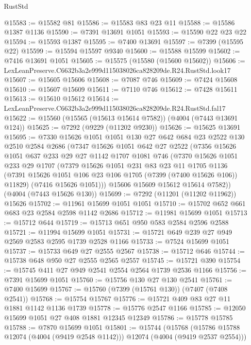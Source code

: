 \begin{lexlean}{RustStd}
\begin{coremodule}
@15583 := @15582 @81
@15586 := @15583 @83 @23 @11
@15588 := @15586 @1387 @1136
@15590 := @7391 @13691 @1051
@15593 := @15590 @22 @23 @22
@15594 := @15593 @1387
@15595 := @7400 @13691
@15597 := @7399 (@15595 @22)
@15599 := @15594 @15597 @9340
@15600 := @15588 @15599
@15602 := @7416 @13691 @1051
@15605 := @15575 (@15580 (@15600 @15602))
@15606 := LexLeanPreserve.C6632b3a2e999d115038026ca828209de.R24.RustStd.look17
@15607 := @15605 @15606
@15608 := @7087 @746
@15609 := @7424 @15608
@15610 := @15607 @15609
@15611 := @7110 @746
@15612 := @7428 @15611
@15613 := @15610 @15612
@15614 := LexLeanPreserve.C6632b3a2e999d115038026ca828209de.R24.RustStd.fal17
@15622 := @15560 (@15565 (@15613 @15614 @7582)) (@4004 (@7443 @13691 @124))
@15625 := @7292 (@9229 (@11202 @9230))
@15626 := @15625 @13691
@15695 := @7330
    @15626
    @1051
    @1051
    @130
    @27
    @642
    @684
    @23
    @2522
    @130
    @2510
    @2584
    @2686
    (@7347
      @15626
      @1051
      @642
      @27
      @2522
      (@7356
        @15626
        @1051
        @637
        @233
        @29
        @27
        @1142
        @1707
        @1081
        @746
        (@7370
          @15626
          @1051
          @233
          @29
          @1707
          (@7379
            @15626
            @1051
            @231
            @83
            @23
            @11
            @1705
            @1136
            (@7391 @15626 @1051 @106 @23 @106 @1705 (@7399 (@7400 @15626 @106)) @11829)
            (@7416 @15626 @1051)))
        @15606
        @15609
        @15612
        @15614
        @7582))
    (@4004 (@7443 @15626 @130))
@15699 := @7292 (@11201 (@11202 @11962)) @15626
@15702 := @11961 @15699 @1051 @1051
@15710 := @15702 @652 @661 @683 @23 @2584 @2598 @1142 @2686
@15712 := @11981 @15699 @1051
@15713 := @15712 @644
@15719 := @15713 @651 @950 @583 @2584 @2596 @2588
@15721 := @11994 @15699 @1051
@15731 := @15721 @649 @239 @27 @949 @2569 @2583 @2595 @1739 @2528 @1166
@15733 := @7524 @15699 @1051
@15737 := @15733 @649 @27 @2555 @2567
@15738 := @15712 @646
@15744 := @15738 @648 @950 @27 @2555 @2565 @2557
@15745 := @15721 @390
@15754 := @15745 @411 @27 @949 @2541 @2554 @2564 @1739 @2536 @1166
@15756 := @7391 @15699 @1051
@15760 := @15756 @130 @27 @130 @2541
@15761 := @7400 @15699
@15767 := @15760 (@7399 (@15761 @130)) (@7407 (@7408 @2541))
@15768 := @15754 @15767
@15776 := @15721 @409 @83 @27 @11 @1881 @1142 @1136 @1739
@15778 := @15776 @2547 @1166
@15785 := @12050 @15699 @1051 @27 @408 @1881 @12345 @12349
@15786 := @15778 @15785
@15788 := @7870 @15699 @1051
@15801 := @15744
    (@15768 (@15786 @15788 @12074 (@4004 (@9419 @2548 @1142))) @12074 (@4004 (@9419 @2537 @2554)))

\end{coremodule}
\end{lexlean}
